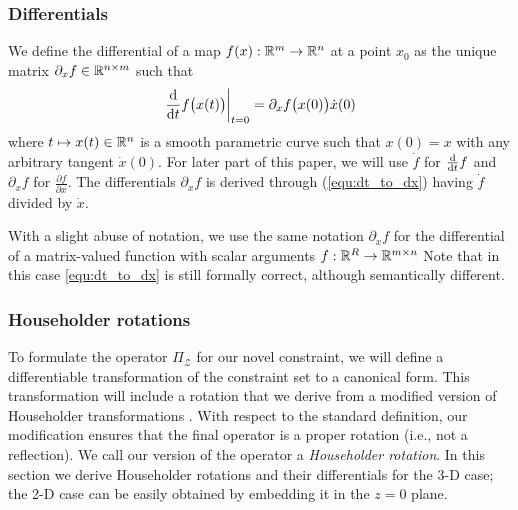 \documentclass[journal]{IEEEtran}  %
\def\sZ{\mathcal{Z}}
\begin{document}
\subsubsection{Differentials}
We define the differential of a map $f(x):\mathbb{R}^{m}{}\to\mathbb{R}^{n}{}$ at a point $x_0$ as the unique matrix $\partial_x f \in\mathbb{R}^{n\times m}{}$ such that
\begin{equation}\label{equ:dt_to_dx}
  \left.\frac{\mathrm{d} }{\mathrm{d} t} f\bigl(x(t)\bigr)\right|_{t=0}=\partial_x f\bigl(x(0)\bigr) \dot{x}(0)
\end{equation}
where $t\mapsto x(t)\in\mathbb{R}^{n}{}$ is a smooth parametric curve such that $x(0)=x$ with any arbitrary tangent $\dot{x}(0)$. For later part of this paper, we will use $\dot f$ for $\frac{\mathrm{d} }{\mathrm{d} t} f$ and $\partial_x f$ for $\frac{\partial f}{\partial x}$. The differentials $\partial_x f$ is derived through (\ref{equ:dt_to_dx}) having $\dot f$ divided by $\dot x$.

With a slight abuse of notation, we use the same notation $\partial_xf$ for the differential of a matrix-valued function with scalar arguments $f:\mathbb{R}^{R}{}\to\mathbb{R}^{m\times n}{}$  Note that in this case \eqref{equ:dt_to_dx} is still formally correct, although semantically different.

 \subsubsection{Householder rotations}\label{sec:householder}
  To formulate the operator $\Pi_\sZ$ for our novel constraint, we will define a differentiable transformation of the constraint set to a canonical form. This transformation will include a rotation that we derive from a modified version of Householder transformations \cite{householder1958unitary}. With respect to the standard definition, our modification ensures that the final operator is a proper rotation (i.e., not a reflection). We call our version of the operator a \emph{Householder rotation}. In this section we derive Householder rotations and their differentials for the 3-D case; the 2-D case can be easily obtained by embedding it in the $z=0$ plane.
\end{document}
